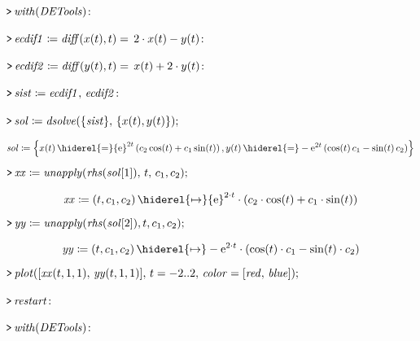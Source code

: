 \documentclass{article}
\begin{document}
\mapleinput
{$ \displaystyle \texttt{>\,} \mathit{with} (\mathit{DETools})\colon  $}

\mapleinput
{$ \displaystyle \texttt{>\,} \mathit{ecdif1} \coloneqq \mathit{diff} (x (t),t)=\,2\cdot x (t)-y (t)\colon  $}

\mapleinput
{$ \displaystyle \texttt{>\,} \mathit{ecdif2} \coloneqq \mathit{diff} (y (t),t)=\,x (t)+2\cdot y (t)\colon  $}

\mapleinput
{$ \displaystyle \texttt{>\,} \mathit{sist} \coloneqq \mathit{ecdif1} ,\,\mathit{ecdif2} \colon  $}

\mapleinput
{$ \displaystyle \texttt{>\,} \mathit{sol} \coloneqq \mathit{dsolve} (\{\mathit{sist} \},\,\{x (t),y (t)\}); $}

\begin{dmath}\label{(2)}
\mathit{sol} \coloneqq \left\{x \! \left(t \right) \hiderel{=} {\mathrm e}^{2 t} \left(c_{2} \cos \! \left(t \right)+c_{1} \sin \! \left(t \right)\right),
\\
y \! \left(t \right)\hiderel{=}-{\mathrm e}^{2 t} \left(\cos \! \left(t \right) c_{1}-\sin \! \left(t \right) c_{2}\right)\right\}
\end{dmath}
\mapleinput
{$ \displaystyle \texttt{>\,} \mathit{xx} \coloneqq \mathit{unapply} (\mathit{rhs} (\mathit{sol} [1]),\,t ,\,c_{1},c_{2}); $}

\begin{dmath}\label{(3)}
\mathit{xx} \coloneqq \left(t ,c_{1},c_{2}\right)\hiderel{\mapsto }{\mathrm e}^{2\cdot t}\cdot \left(c_{2}\cdot \cos \! \left(t \right)+c_{1}\cdot \sin \! \left(t \right)\right)
\end{dmath}
\mapleinput
{$ \displaystyle \texttt{>\,} \mathit{yy} \coloneqq \mathit{unapply} (\mathit{rhs} (\mathit{sol} [2]),t ,c_{1},c_{2}); $}

\begin{dmath}\label{(4)}
\mathit{yy} \coloneqq \left(t ,c_{1},c_{2}\right)\hiderel{\mapsto }-{\mathrm e}^{2\cdot t}\cdot \left(\cos \! \left(t \right)\cdot c_{1}-\sin \! \left(t \right)\cdot c_{2}\right)
\end{dmath}
\mapleinput
{$ \displaystyle \texttt{>\,} \mathit{plot} ([\mathit{xx} (t ,1,1),\,\mathit{yy} (t ,1,1)],\,t =-2..2,\,\mathit{color} =[\mathit{red} ,\,\mathit{blue}]); $}

{}
\mapleinput
{$ \displaystyle \texttt{>\,} \mathit{restart} \colon  $}

\mapleinput
{$ \displaystyle \texttt{>\,} \mathit{with} (\mathit{DETools})\colon  $}
\end{document}
